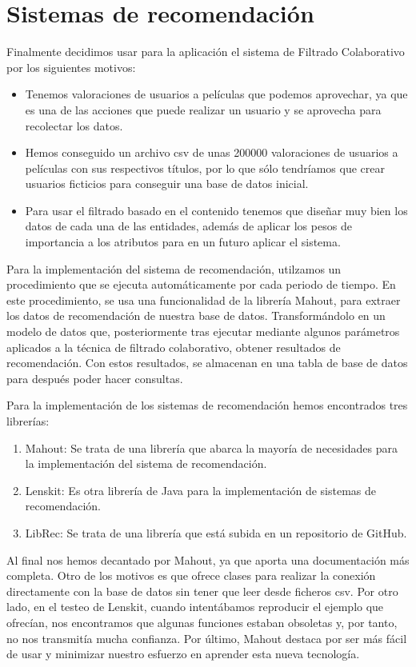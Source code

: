 \section{Sistemas de recomendación}
\label{makereference4.5}
Finalmente decidimos usar para la aplicación el sistema de Filtrado Colaborativo por los siguientes motivos:

\begin{itemize}
    \item Tenemos valoraciones de usuarios a películas que podemos aprovechar, ya que es una de las acciones que puede realizar un usuario y se aprovecha para recolectar los datos.
    \item Hemos conseguido un archivo csv de unas 200000 valoraciones de usuarios a películas con sus respectivos títulos, por lo que sólo tendríamos que crear usuarios ficticios para conseguir una base de datos inicial.
    \item Para usar el filtrado basado en el contenido tenemos que diseñar muy bien los datos de cada una de las entidades, además de aplicar los pesos de importancia a los atributos para en un futuro aplicar el sistema.  
\end{itemize} 

Para la implementación del sistema de recomendación, utilzamos un procedimiento
que se ejecuta automáticamente por cada periodo de tiempo. En este procedimiento,
se usa una funcionalidad de la librería Mahout, para extraer los datos de recomendación
de nuestra base de datos. Transformándolo en un modelo de datos que, posteriormente tras
ejecutar mediante algunos parámetros aplicados a la técnica de filtrado colaborativo, obtener 
resultados de recomendación. Con estos resultados, se almacenan en una tabla de base de datos 
para después poder hacer consultas.


Para la implementación de los sistemas de recomendación hemos encontrados tres librerías:
\begin{enumerate}
    \item Mahout: Se trata de una librería que abarca la mayoría de necesidades para la implementación del sistema de recomendación.
    \item Lenskit: Es otra librería de Java para la implementación de sistemas de recomendación.
    \item LibRec: Se trata de una librería que está subida en un repositorio de GitHub.
\end{enumerate}

Al final nos hemos decantado por Mahout, ya que aporta una documentación más completa. Otro de los motivos es que ofrece clases para realizar la conexión directamente con la base de datos 
sin tener que leer desde ficheros csv. Por otro lado, en el testeo de 
Lenskit, cuando intentábamos reproducir el ejemplo que ofrecían, nos encontramos que algunas funciones estaban 
obsoletas y, por tanto, no nos transmitía mucha confianza. Por último, Mahout destaca por ser más fácil de usar y minimizar nuestro esfuerzo en aprender esta nueva tecnología.
